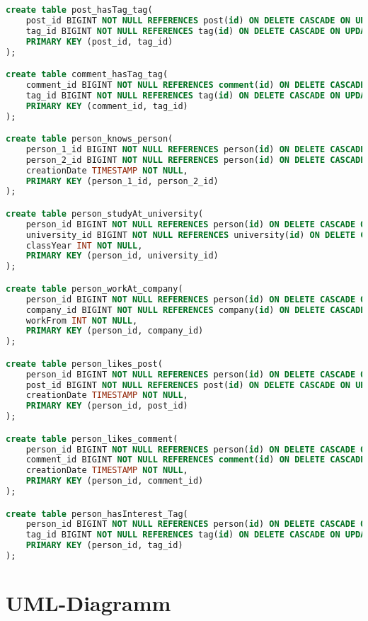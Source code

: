 \begin{lstlisting}[language=sql]
create table post_hasTag_tag(
    post_id BIGINT NOT NULL REFERENCES post(id) ON DELETE CASCADE ON UPDATE CASCADE,
    tag_id BIGINT NOT NULL REFERENCES tag(id) ON DELETE CASCADE ON UPDATE CASCADE,
    PRIMARY KEY (post_id, tag_id)
);

create table comment_hasTag_tag(
    comment_id BIGINT NOT NULL REFERENCES comment(id) ON DELETE CASCADE ON UPDATE CASCADE,
    tag_id BIGINT NOT NULL REFERENCES tag(id) ON DELETE CASCADE ON UPDATE CASCADE,
    PRIMARY KEY (comment_id, tag_id)
);

create table person_knows_person(
    person_1_id BIGINT NOT NULL REFERENCES person(id) ON DELETE CASCADE ON UPDATE CASCADE,
    person_2_id BIGINT NOT NULL REFERENCES person(id) ON DELETE CASCADE ON UPDATE CASCADE,
    creationDate TIMESTAMP NOT NULL,
    PRIMARY KEY (person_1_id, person_2_id)
);

create table person_studyAt_university(
    person_id BIGINT NOT NULL REFERENCES person(id) ON DELETE CASCADE ON UPDATE CASCADE,
    university_id BIGINT NOT NULL REFERENCES university(id) ON DELETE CASCADE ON UPDATE CASCADE,
    classYear INT NOT NULL,
    PRIMARY KEY (person_id, university_id)
);

create table person_workAt_company(
    person_id BIGINT NOT NULL REFERENCES person(id) ON DELETE CASCADE ON UPDATE CASCADE,
    company_id BIGINT NOT NULL REFERENCES company(id) ON DELETE CASCADE ON UPDATE CASCADE,
    workFrom INT NOT NULL,
    PRIMARY KEY (person_id, company_id)
);

create table person_likes_post(
    person_id BIGINT NOT NULL REFERENCES person(id) ON DELETE CASCADE ON UPDATE CASCADE,
    post_id BIGINT NOT NULL REFERENCES post(id) ON DELETE CASCADE ON UPDATE CASCADE,
    creationDate TIMESTAMP NOT NULL,
    PRIMARY KEY (person_id, post_id)
);

create table person_likes_comment(
    person_id BIGINT NOT NULL REFERENCES person(id) ON DELETE CASCADE ON UPDATE CASCADE,
    comment_id BIGINT NOT NULL REFERENCES comment(id) ON DELETE CASCADE ON UPDATE CASCADE,
    creationDate TIMESTAMP NOT NULL,
    PRIMARY KEY (person_id, comment_id)
);

create table person_hasInterest_Tag(
    person_id BIGINT NOT NULL REFERENCES person(id) ON DELETE CASCADE ON UPDATE CASCADE,
    tag_id BIGINT NOT NULL REFERENCES tag(id) ON DELETE CASCADE ON UPDATE CASCADE,
    PRIMARY KEY (person_id, tag_id)
);
\end{lstlisting}

\section*{UML-Diagramm}
~

